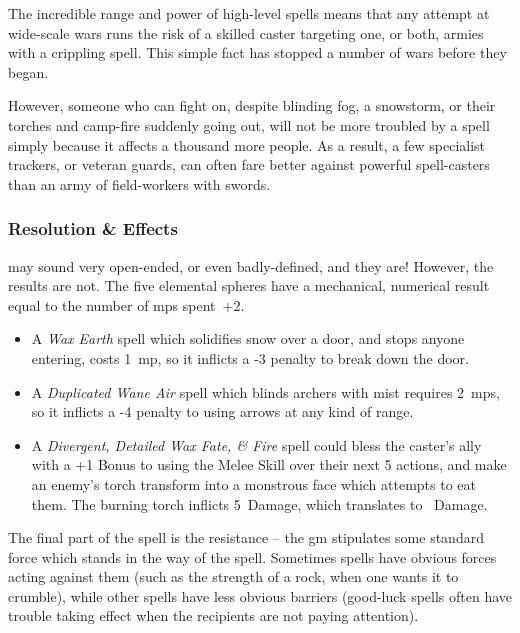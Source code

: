\begin{multicols}{2}
\begin{exampletext}
  The incredible range and power of high-level spells means that any attempt at wide-scale wars runs the risk of a skilled caster targeting one, or both, armies with a crippling spell.
  This simple fact has stopped a number of wars before they began.

  However, someone who can fight on, despite blinding fog, a snowstorm, or their torches and camp-fire suddenly going out, will not be more troubled by a spell simply because it affects a thousand more people.
  As a result, a few specialist trackers, or veteran \glspl{guard}, can often fare better against powerful spell-casters than an army of field-workers with swords.
\end{exampletext}

\subsubsection{Resolution \& Effects}
may sound very open-ended, or even badly-defined, and they are!
However, the results are not.
The five elemental \glspl{sphere} have a mechanical, numerical result equal to the number of \glspl{mp} spent~+2.

\begin{itemize}
  \item
  A \textit{Wax Earth} spell which solidifies snow over a door, and stops anyone entering, costs 1~\gls{mp}, so it inflicts a -3 penalty to break down the door.
  \item
  A \textit{Duplicated Wane Air} spell which blinds archers with mist requires 2~\glspl{mp}, so it inflicts a -4 penalty to using arrows at any kind of range.
  \item
  A \textit{Divergent, Detailed Wax Fate, \& Fire} spell could bless the caster's ally with a +1 Bonus to using the Melee Skill over their next 5 actions, and make an enemy's torch transform into a monstrous face which attempts to eat them.
  The burning torch inflicts 5~Damage, which translates to ~Damage.%
\end{itemize}

The final part of the spell is the resistance -- the \gls{gm} stipulates some standard force which stands in the way of the spell.
Sometimes spells have obvious forces acting against them (such as the strength of a rock, when one wants it to crumble), while other spells have less obvious barriers (good-luck spells often have trouble taking effect when the recipients are not paying attention).


\end{multicols}
